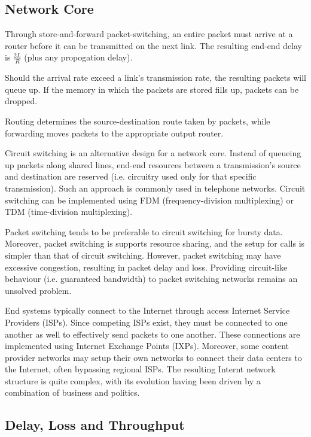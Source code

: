 \documentclass[12pt,titlepage]{article}
\begin{document}
    \subsection{Network Core}
      Through store-and-forward packet-switching, an entire packet must arrive at a router before it can be transmitted on the next link. The
      resulting end-end delay is $\frac{2L}{R}$ (plus any propogation delay).

      Should the arrival rate exceed a link's transmission rate, the resulting packets will queue up. If the memory in which the packets are
      stored fills up, packets can be dropped.

      Routing determines the source-destination route taken by packets, while forwarding moves packets to the appropriate output router.

      Circuit switching is an alternative design for a network core. Instead of queueing up packets along shared lines, end-end resources
      between a transmission's source and destination are reserved (i.e. circuitry used only for that specific transmission). Such an approach
      is commonly used in telephone networks. Circuit switching can be implemented using FDM (frequency-division multiplexing) or TDM
      (time-division multiplexing).

      Packet switching tends to be preferable to circuit switching for bursty data. Moreover, packet switching is supports resource sharing,
      and the setup for calls is simpler than that of circuit switching. However, packet switching may have excessive congestion, resulting
      in packet delay and loss. Providing circuit-like behaviour (i.e. guaranteed bandwidth) to packet switching networks remains an unsolved
      problem.

      End systems typically connect to the Internet through access Internet Service Providers (ISPs). Since competing ISPs exist, they must be
      connected to one another as well to effectively send packets to one another. These connections are implemented using Internet Exchange
      Points (IXPs). Moreover, some content provider networks may setup their own networks to connect their data centers to the Internet,
      often bypassing regional ISPs.  The resulting Internt network structure is quite complex, with its evolution having been driven by a
      combination of business and politics.

    \subsection{Delay, Loss and Throughput}
\end{document}
